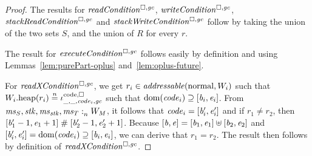 \documentclass[a4paper]{article}
\begin{document}
\begin{proof}
  The results for $\readCond{}$, $\writeCond{}$, $\stackReadCond{}$ and $\stackWriteCond{}$ follow by taking the union of the two sets $S$, and the union of $R$ for every $r$.

  The result for $\execCond{}$ follows easily by definition and using Lemmas~\ref{lem:purePart-oplus} and~\ref{lem:oplus-future}.

  For $\xReadCond{}$, we get $r_i \in \addressable{\normal,W_i}$ such that $\pwheap[W_i](r_i) \nequal \codereg{\_,\_,\code_i,\gc}$ such that $\dom(\code_i)\supseteq [\baddr_i,\eaddr_i]$.
  From $\memSat{\ms_S,\stk,\ms_\stk,\ms_T}{W_M}$, it follows that $\code_i = [\baddr_i',\eaddr_i']$ and if $r_1 \neq r_2$, then $[\baddr_1'-1,\eaddr_1+1] \mathrel{\#} [\baddr_2'-1,\eaddr_2'+1]$.
  Because $[\baddr,\eaddr] = [\baddr_1,\eaddr_1] \uplus [\baddr_2,\eaddr_2]$ and $[\baddr_i',\eaddr_i'] = \dom(\code_i)\supseteq [\baddr_i,\eaddr_i]$, we can derive that $r_1= r_2$.
  The result then follows by definition of $\xReadCond{}$.
\end{proof}
\end{document}

